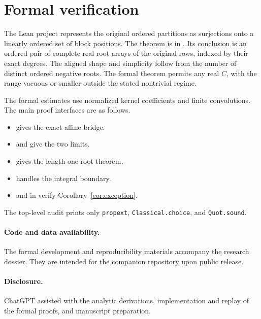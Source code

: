 \documentclass[11pt]{article}
\begin{document}
\section{Formal verification}

The Lean project represents the original ordered partitions as surjections onto a linearly ordered set of block positions. The theorem is  in . Its conclusion is an ordered pair of complete real root arrays of the original rows, indexed by their exact degrees. The aligned shape and simplicity follow from the number of distinct ordered negative roots. The formal theorem permits any real \(C\), with the range vacuous or smaller outside the stated nontrivial regime.

The formal estimates use normalized kernel coefficients and finite convolutions. The main proof interfaces are as follows.
\begin{itemize}
 \item {} gives the exact affine bridge.
 \item {} and  give the two limits.
 \item {} gives the length-one root theorem.
 \item {} handles the integral boundary.
 \item {} and  in
    verify Corollary~\ref{cor:exception}.
\end{itemize}
The top-level audit prints only \texttt{propext}, \texttt{Classical.choice}, and \texttt{Quot.sound}.

\paragraph{Code and data availability.}
The formal development and reproducibility materials accompany the research dossier. They are intended for the \href{https://github.com/AlexZander-666/ordered-partition-large-blocks}{companion repository} upon public release.

\paragraph{Disclosure.}
ChatGPT assisted with the analytic derivations, implementation and replay of the formal proofs, and manuscript preparation.
\end{document}
